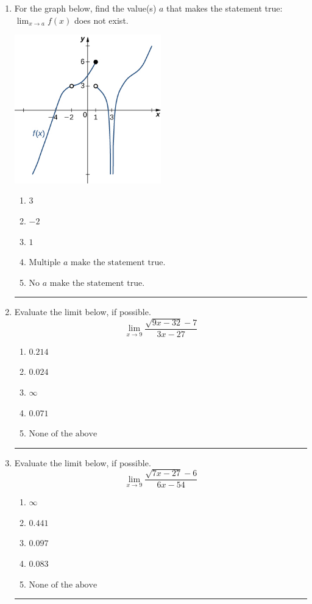 \documentclass[14pt]{extbook}
\newcommand{\litem}[1]{\item#1\hspace*{-1cm}\rule{\textwidth}{0.4pt}}
\begin{document}
\begin{enumerate}
{\begin{enumerate}[label=\Alph*.]
\end{enumerate} }
\litem{
For the graph below, find the value(s) $a$ that makes the statement true: $ \displaystyle \lim_{x \rightarrow a} f(x)$ does not exist.
\begin{center}
    \includegraphics[width=0.5\textwidth]{../Figures/evaluateLimitGraphicallyCopyC.png}
\end{center}
\begin{enumerate}[label=\Alph*.]
\item \( 3 \)
\item \( -2 \)
\item \( 1 \)
\item \( \text{Multiple } a \text{ make the statement true}. \)
\item \( \text{No } a \text{ make the statement true}. \)

\end{enumerate} }
\litem{
Evaluate the limit below, if possible.\[ \lim_{x \rightarrow 9} \frac{\sqrt{9x - 32} - 7}{3x - 27} \]\begin{enumerate}[label=\Alph*.]
\item \( 0.214 \)
\item \( 0.024 \)
\item \( \infty \)
\item \( 0.071 \)
\item \( \text{None of the above} \)

\end{enumerate} }
\litem{
Evaluate the limit below, if possible.\[ \lim_{x \rightarrow 9} \frac{\sqrt{7x - 27} - 6}{6x - 54} \]\begin{enumerate}[label=\Alph*.]
\item \( \infty \)
\item \( 0.441 \)
\item \( 0.097 \)
\item \( 0.083 \)
\item \( \text{None of the above} \)


\end{enumerate}}
\end{enumerate}
\end{document}
